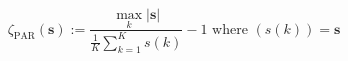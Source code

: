 \begin{equation}
	\zeta_\text{PAR}(\textbf{s}) := \frac{\max_k \left| \textbf{s} \right|}{\frac{1}{K}\sum_{k=1}^{K}{s}(k)} - 1
	\text{ where } ({s}(k)) = \textbf{s}
\label{ch1:equ:peak-to-average-definition}
\end{equation}